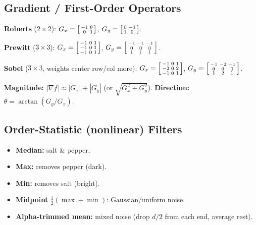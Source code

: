\documentclass[10pt]{article}
\begin{document}
\subsection{Gradient / First-Order Operators}
\begin{tcolorbox}[studybox]
\textbf{Roberts} ($2\times2$):
\(G_x = \begin{bsmallmatrix}-1&0\\0&1\end{bsmallmatrix}\),
\(G_y = \begin{bsmallmatrix}0&-1\\1&0\end{bsmallmatrix}\).
\smallskip

\textbf{Prewitt} ($3\times3$):
\(G_x = \begin{bsmallmatrix}-1&0&1\\-1&0&1\\-1&0&1\end{bsmallmatrix}\),
\(G_y = \begin{bsmallmatrix}-1&-1&-1\\0&0&0\\1&1&1\end{bsmallmatrix}\).
\smallskip

\textbf{Sobel} ($3\times3$, weights center row/col more):
\(G_x = \begin{bsmallmatrix}-1&0&1\\-2&0&2\\-1&0&1\end{bsmallmatrix}\),
\(G_y = \begin{bsmallmatrix}-1&-2&-1\\0&0&0\\1&2&1\end{bsmallmatrix}\).
\smallskip

\textbf{Magnitude:} $|\nabla f| \approx |G_x| + |G_y|$ (or $\sqrt{G_x^2+G_y^2}$).
\textbf{Direction:} $\theta = \arctan(G_y/G_x)$.
\end{tcolorbox}

\subsection{Order-Statistic (nonlinear) Filters}
\begin{itemize}
  \item \textbf{Median:} salt \& pepper.
  \item \textbf{Max:} removes pepper (dark).
  \item \textbf{Min:} removes salt (bright).
  \item \textbf{Midpoint} $\tfrac{1}{2}(\max+\min)$: Gaussian/uniform noise.
  \item \textbf{Alpha-trimmed mean:} mixed noise (drop $d/2$ from each end, average rest).
\end{itemize}
\end{document}
